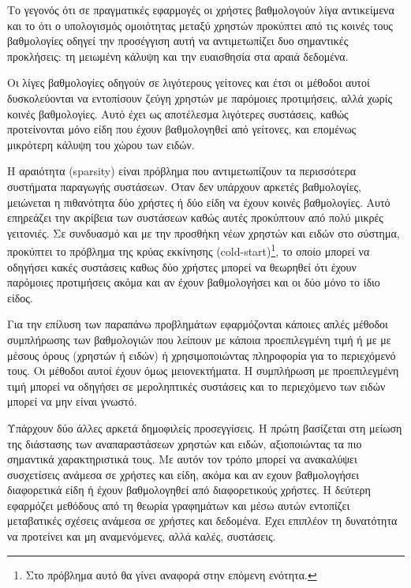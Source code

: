 Το γεγονός ότι σε πραγματικές εφαρμογές οι χρήστες βαθμολογούν λίγα α\-ντικείμενα και το ότι ο υπολογισμός ομοιότητας μεταξύ χρηστών προκύπτει από τις κοινές τους βαθμολογίες οδηγεί την προσέγγιση αυτή να αντιμετωπίζει δυο σημαντικές προκλήσεις: τη μειωμένη κάλυψη και την ευαισθησία στα αραιά δεδομένα. \par
Οι λίγες βαθμολογίες οδηγούν σε λιγότερους γείτονες και έτσι οι μέθοδοι αυτοί δυσκολεύονται να εντοπίσουν ζεύγη χρηστών με παρόμοιες προτιμήσεις, αλλά χωρίς κοινές βαθμολογίες. Αυτό έχει ως αποτέλεσμα λιγότερες συστάσεις, καθώς προτείνονται μόνο είδη που έχουν βαθμολογηθεί από γείτονες, και επομένως μικρότερη κάλυψη του χώρου των ειδών. \par
Η αραιότητα ({\en sparsity}) είναι πρόβλημα που αντιμετωπίζουν τα περισσότερα συστήματα παραγωγής συστάσεων. Όταν δεν υπάρχουν αρκετές βαθμολογίες, μειώνεται η πιθανότητα δύο χρήστες ή δύο είδη να έχουν κοινές βαθμολογίες. Αυτό επηρεάζει την ακρίβεια των συστάσεων καθώς αυτές προκύπτουν από πολύ μικρές γειτονιές. Σε συνδυασμό και με την προσθήκη νέων χρηστών και ειδών στο σύστημα, προκύπτει το πρόβλημα της κρύας εκκίνησης ({\en cold-start})\footnote{Στο πρόβλημα αυτό θα γίνει αναφορά στην επόμενη ενότητα.}, το οποίο μπορεί να οδηγήσει κακές συστάσεις καθως δύο χρήστες μπορεί να θεωρηθεί ότι έχουν παρόμοιες προτιμήσεις ακόμα και αν έχουν βαθμολογήσει και οι δύο μόνο το ίδιο είδος. \par
Για την επίλυση των παραπάνω προβλημάτων εφαρμόζονται κάποιες απλές μέθοδοι συμπλήρωσης των βαθμολογιών που λείπουν με κάποια προεπιλεγμένη τιμή ή με με μέσους όρους (χρηστών ή ειδών) ή χρησιμοποιώντας πληροφορία για το περιεχόμενό τους. Οι μέθοδοι αυτοί έχουν όμως μειονεκτήματα. Η συμπλήρωση με προεπιλεγμένη τιμή μπορεί να οδηγήσει σε μεροληπτικές συστάσεις και το περιεχόμενο των ειδών μπορεί να μην είναι γνωστό.\par Υπάρχουν δύο άλλες αρκετά δημοφιλείς προσεγγίσεις. Η πρώτη βασίζεται στη μείωση της διάστασης των αναπαραστάσεων χρηστών και ειδών, αξιοποιώντας τα πιο σημαντικά χαρακτηριστικά τους. Με αυτόν τον τρόπο μπορεί να ανακαλύψει συσχετίσεις ανάμεσα σε χρήστες και είδη, ακόμα και αν εχουν βαθμολογήσει διαφορετικά είδη ή έχουν βαθμολογηθεί από διαφορετικούς χρήστες. Η δεύτερη εφαρμόζει μεθόδους από τη θεωρία γραφημάτων και μέσω αυτών εντοπίζει μεταβατικές σχέσεις ανάμεσα σε χρήστες και δεδομένα. Έχει επιπλέον τη δυνατότητα να προτείνει και μη αναμενόμενες, αλλά καλές, συστάσεις.
